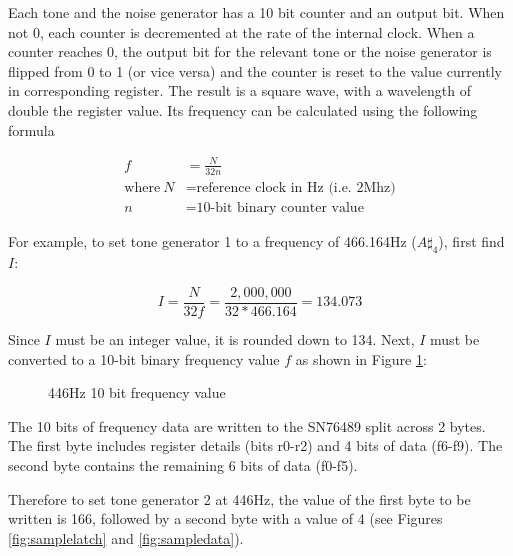 \documentclass[a4paper,11pt,twoside,openright]{report}
\begin{document}
Each tone and the noise generator has a 10 bit counter and an output bit. When not 0, each counter is 
decremented at the rate of the internal clock. When a counter reaches 0, the output bit for the relevant 
tone or the noise generator is flipped from 0 to 1 (or vice versa) and the counter is reset to the value
currently in corresponding register. The result is a square wave, with a wavelength of double the 
register value. Its frequency can be calculated using the following formula

\begin{align*}
	f &= \frac{N}{32n} \\
	\text{where}~N &= \text{reference clock in Hz (i.e. 2Mhz)} \\
	n &= \text{10-bit binary counter value}
\end{align*}

For example, to set tone generator 1 to a frequency of 466.164Hz (\textit{$A\sharp_4$}), 
first find \(I\):

$$
 I = \frac{N}{32f}
 = \frac{2,000,000}{32 * 466.164}
 = 134.073
$$

Since \(I\) must be an integer value, it is rounded down to 134. Next, \(I\) must 
be converted to a 10-bit binary frequency value \(f\) as shown in Figure \ref{fig:samplevalue}\footnotemark:

\begin{figure}[h!]
\centering
{}
\caption[466Hz 10 bit frequency value]{446Hz 10 bit frequency value}
\label{fig:samplevalue}
\end{figure}


The 10 bits of frequency data are written to the SN76489 split across 2 bytes. The first byte includes 
register details (bits r0-r2) and 4 bits of data (f6-f9). The second byte contains the remaining 6 bits 
of data (f0-f5).  

Therefore to set tone generator 2 at 446Hz, the value of the first byte to be written is 166, followed 
by a second byte with a value of 4 (see Figures \ref{fig:samplelatch} and \ref{fig:sampledata}).
\end{document}
